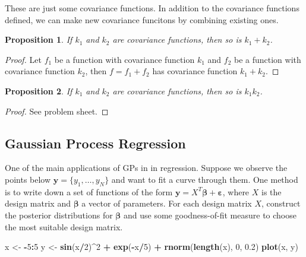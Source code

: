 \documentclass[
]{book}
\newenvironment{Shaded}{\begin{snugshade}}{\end{snugshade}}
\newcommand{\DecValTok}[1]{\textcolor[rgb]{0.00,0.00,0.81}{#1}}
\newcommand{\FloatTok}[1]{\textcolor[rgb]{0.00,0.00,0.81}{#1}}
\newcommand{\FunctionTok}[1]{\textcolor[rgb]{0.13,0.29,0.53}{\textbf{#1}}}
\newcommand{\NormalTok}[1]{#1}
\newcommand{\OtherTok}[1]{\textcolor[rgb]{0.56,0.35,0.01}{#1}}
\newcommand{\SpecialCharTok}[1]{\textcolor[rgb]{0.81,0.36,0.00}{\textbf{#1}}}
\newtheorem{proposition}{Proposition}[chapter]
\theoremstyle{definition}
\theoremstyle{definition}
\theoremstyle{definition}
\theoremstyle{definition}
\theoremstyle{remark}
\begin{document}
These are just some covariance functions. In addition to the covariance functions defined, we can make new covariance funcitons by combining existing ones.

\begin{proposition}
If \(k_1\) and \(k_2\) are covariance functions, then so is \(k_1 + k_2\).
\end{proposition}

\begin{proof}
Let \(f_1\) be a function with covariance function \(k_1\) and \(f_2\) be a function with covariance function \(k_2\), then \(f = f_1 + f_2\) has covariance function \(k_1 + k_2\).
\end{proof}

\begin{proposition}
If \(k_1\) and \(k_2\) are covariance functions, then so is \(k_1k_2\).
\end{proposition}

\begin{proof}
See problem sheet.
\end{proof}

\hypertarget{gaussian-process-regression}{%
\subsection{Gaussian Process Regression}\label{gaussian-process-regression}}

One of the main applications of GPs in in regression. Suppose we observe the points below \(\boldsymbol{y} = \{y_1, \ldots, y_N\}\) and want to fit a curve through them. One method is to write down a set of functions of the form \(\boldsymbol{y} = X^T\boldsymbol{\beta} + \boldsymbol{\varepsilon}\), where \(X\) is the design matrix and \(\boldsymbol{\beta}\) a vector of parameters. For each design matrix \(X\), construct the posterior distributions for \(\boldsymbol{\beta}\) and use some goodness-of-fit measure to choose the most suitable design matrix.

\begin{Shaded}
\begin{Highlighting}[]
\NormalTok{x }\OtherTok{\textless{}{-}} \SpecialCharTok{{-}}\DecValTok{5}\SpecialCharTok{:}\DecValTok{5}
\NormalTok{y }\OtherTok{\textless{}{-}} \FunctionTok{sin}\NormalTok{(x}\SpecialCharTok{/}\DecValTok{2}\NormalTok{)}\SpecialCharTok{\^{}}\DecValTok{2} \SpecialCharTok{+} \FunctionTok{exp}\NormalTok{(}\SpecialCharTok{{-}}\NormalTok{x}\SpecialCharTok{/}\DecValTok{5}\NormalTok{) }\SpecialCharTok{+} \FunctionTok{rnorm}\NormalTok{(}\FunctionTok{length}\NormalTok{(x), }\DecValTok{0}\NormalTok{, }\FloatTok{0.2}\NormalTok{)}
\FunctionTok{plot}\NormalTok{(x, y)}
\end{Highlighting}
\end{Shaded}
\end{document}

